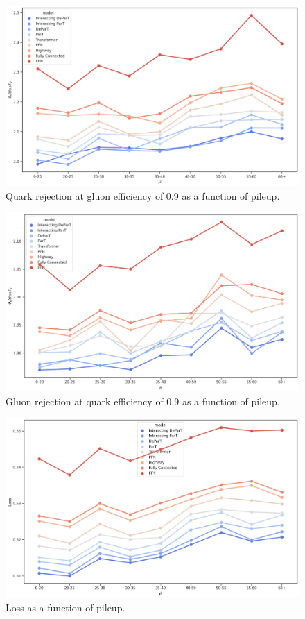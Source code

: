 \begin{figure}[htb]
    \centering
    \includegraphics[width=0.95\linewidth]{src/plots/results/mu_dep/quark_rej_at_gluon_eff_0.9.jpg}
    \caption{Quark rejection at gluon efficiency of 0.9 as a function of pileup.}
    \label{fig:quark_rej_at_gluon_eff_0.9_pileup}
\end{figure}

\begin{figure}[htb]
    \centering
    \includegraphics[width=0.95\linewidth]{src/plots/results/mu_dep/gluon_rej_at_quark_eff_0.9.jpg}
    \caption{Gluon rejection at quark efficiency of 0.9 as a function of pileup.}
    \label{fig:gluon_rej_at_quark_eff_0.9_pileup}
\end{figure}

\begin{figure}[htb]
    \centering
    \includegraphics[width=0.95\linewidth]{src/plots/results/mu_dep/loss.jpg}
    \caption{Loss as a function of pileup.}
    \label{fig:loss_pileup}
\end{figure}


